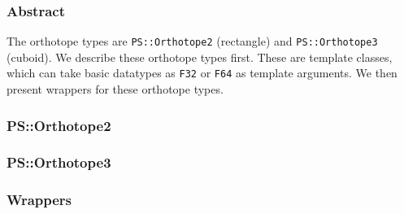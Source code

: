 \subsubsection{Abstract}

The orthotope types are \texttt{PS::Orthotope2} (rectangle) and
\texttt{PS::Orthotope3} (cuboid). We describe these orthotope types first.
These are template classes, which can take basic datatypes
as \texttt{F32} or \texttt{F64} as template arguments. We then present
wrappers for these orthotope types.


\subsubsection{PS::Orthotope2}



\subsubsection{PS::Orthotope3}



\subsubsection{Wrappers}



